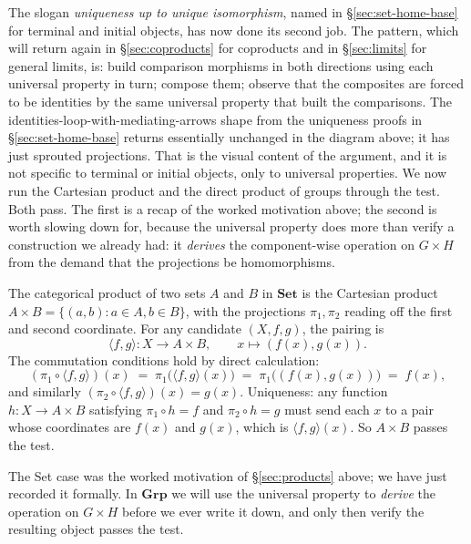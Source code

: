 \noindent The slogan \textit{uniqueness up to unique
isomorphism}, named in
\S\ref{sec:set-home-base} for terminal and initial objects, has now
done its second job. The pattern, which will return again in
\S\ref{sec:coproducts} for coproducts and in \S\ref{sec:limits} for
general limits, is: build comparison morphisms in both directions using
each universal property in turn; compose them; observe that the
composites are forced to be identities by the same universal property
that built the comparisons. The
identities-loop-with-mediating-arrows shape from the uniqueness
proofs in \S\ref{sec:set-home-base} returns essentially unchanged in
the diagram above; it has just sprouted projections. That is the visual
content of the argument, and it is not specific to terminal or initial
objects, only to universal properties.
\newpage
\noindent We now run the Cartesian product and the direct product of
groups through the test. Both pass. The first is a recap of the worked
motivation above; the second is worth slowing down for, because the
universal property does more than verify a construction we already
had: it \textit{derives} the component-wise operation on $G \times H$
from the demand that the projections be homomorphisms.

\begin{example}\label{ex:set-product}
The categorical product of two sets $A$ and $B$ in $\mathbf{Set}$ is the
Cartesian product $A \times B = \{(a, b) : a \in A, b \in B\}$, with the
projections $\pi_1, \pi_2$ reading off the first and second coordinate.
For any candidate $(X, f, g)$, the pairing is
\[ \langle f, g \rangle : X \to A \times B, \qquad x \mapsto (f(x),
g(x)). \]
The commutation conditions hold by direct calculation:
\[ (\pi_1 \circ \langle f, g \rangle)(x) \; = \; \pi_1\bigl(\langle
   f, g \rangle(x)\bigr) \; = \; \pi_1\bigl((f(x), g(x))\bigr) \; =
   \; f(x), \]
and similarly $(\pi_2 \circ \langle f, g \rangle)(x) = g(x)$.
Uniqueness: any function $h : X \to A \times B$ satisfying
$\pi_1 \circ h = f$ and $\pi_2 \circ h = g$ must send each $x$ to a
pair whose coordinates are $f(x)$ and $g(x)$, which is
$\langle f, g \rangle(x)$. So $A \times B$ passes the test.
\end{example}

\noindent The Set case was the worked motivation of
\S\ref{sec:products} above; we have just recorded it formally. In
$\mathbf{Grp}$ we will use the universal property to \textit{derive}
the operation on $G \times H$ before we ever write it down, and only
then verify the resulting object passes the test.

